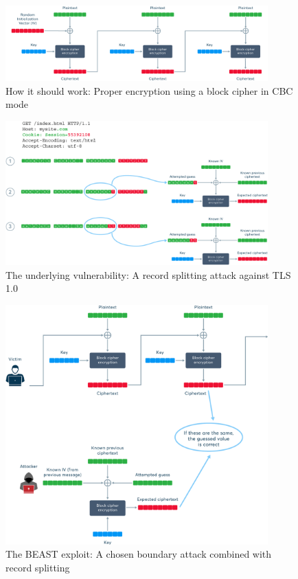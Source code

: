 \begin{figure}[h]
    \includegraphics[width=0.9\textwidth]{figures/fig12-beast-attack-1}
    \centering
    \caption{How it should work: Proper encryption using a block cipher in CBC mode}
\end{figure}
\begin{figure}[h]
    \includegraphics[width=0.9\textwidth]{figures/fig13-beast-attack-2}
    \centering
    \caption{The underlying vulnerability: A record splitting attack against TLS 1.0}
\end{figure}
\begin{figure}[h]
    \includegraphics[width=0.9\textwidth]{figures/fig14-beast-attack-3}
    \centering
    \caption{The BEAST exploit: A chosen boundary attack combined with record splitting}
\end{figure}